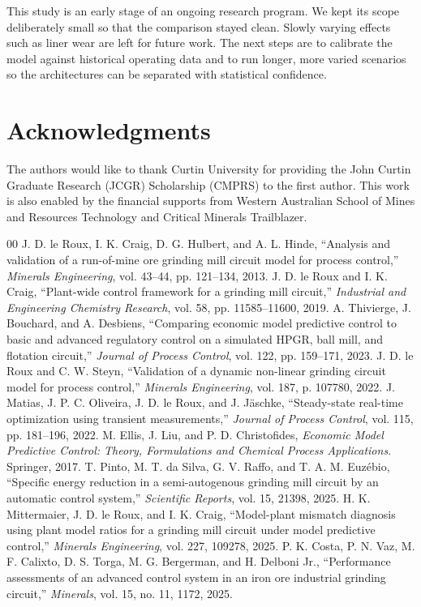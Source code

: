\documentclass[conference]{IEEEtran}
\begin{document}
This study is an early stage of an ongoing research program. We kept
its scope deliberately small so that the comparison stayed clean.
Slowly varying effects such as liner wear are left for future work.
The next steps are to calibrate the model against historical
operating data and to run longer, more varied scenarios so the
architectures can be separated with statistical confidence.

\section*{Acknowledgments}

The authors would like to thank Curtin University for providing the
John Curtin Graduate Research (JCGR) Scholarship (CMPRS) to the first
author. This work is also enabled by the financial supports from
Western Australian School of Mines and Resources Technology and
Critical Minerals Trailblazer.

\begin{thebibliography}{00}
 J. D. le Roux, I. K. Craig, D. G. Hulbert, and A. L.
Hinde, ``Analysis and validation of a run-of-mine ore grinding mill
circuit model for process control,'' \emph{Minerals Engineering}, vol.
43--44, pp. 121--134, 2013.
 J. D. le Roux and I. K. Craig, ``Plant-wide control
framework for a grinding mill circuit,'' \emph{Industrial and Engineering
Chemistry Research}, vol. 58, pp. 11585--11600, 2019.
 A. Thivierge, J. Bouchard, and A. Desbiens,
``Comparing economic model predictive control to basic and advanced
regulatory control on a simulated HPGR, ball mill, and flotation
circuit,'' \emph{Journal of Process Control}, vol. 122, pp. 159--171,
2023.
 J. D. le Roux and C. W. Steyn, ``Validation of a
dynamic non-linear grinding circuit model for process control,''
\emph{Minerals Engineering}, vol. 187, p. 107780, 2022.
 J. Matias, J. P. C. Oliveira, J. D. le Roux, and J.
J\"{a}schke, ``Steady-state real-time optimization using transient
measurements,'' \emph{Journal of Process Control}, vol. 115, pp. 181--196,
2022.
 M. Ellis, J. Liu, and P. D. Christofides,
\emph{Economic Model Predictive Control: Theory, Formulations and Chemical
Process Applications}. Springer, 2017.
 T. Pinto, M. T. da Silva, G. V. Raffo, and T. A. M.
Euz\'ebio, ``Specific energy reduction in a semi-autogenous grinding mill
circuit by an automatic control system,'' \emph{Scientific Reports},
vol. 15, 21398, 2025.
 H. K. Mittermaier, J. D. le Roux, and I. K.
Craig, ``Model-plant mismatch diagnosis using plant model ratios for a
grinding mill circuit under model predictive control,'' \emph{Minerals
Engineering}, vol. 227, 109278, 2025.
 P. K. Costa, P. N. Vaz, M. F. Calixto, D. S. Torga,
M. G. Bergerman, and H. Delboni Jr., ``Performance assessments of an
advanced control system in an iron ore industrial grinding circuit,''
\emph{Minerals}, vol. 15, no. 11, 1172, 2025.
\end{thebibliography}
\end{document}
